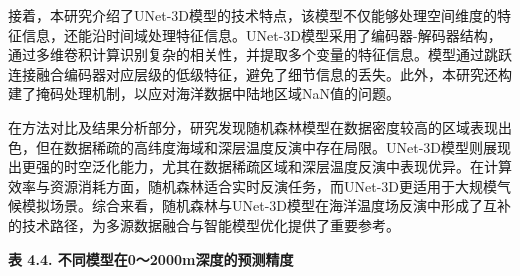 \documentclass[
  12pt,
]{article}
\begin{document}
接着，本研究介绍了UNet-3D模型的技术特点，该模型不仅能够处理空间维度的特征信息，还能沿时间域处理特征信息。UNet-3D模型采用了编码器-解码器结构，通过多维卷积计算识别复杂的相关性，并提取多个变量的特征信息。模型通过跳跃连接融合编码器对应层级的低级特征，避免了细节信息的丢失。此外，本研究还构建了掩码处理机制，以应对海洋数据中陆地区域NaN值的问题。

在方法对比及结果分析部分，研究发现随机森林模型在数据密度较高的区域表现出色，但在数据稀疏的高纬度海域和深层温度反演中存在局限。UNet-3D模型则展现出更强的时空泛化能力，尤其在数据稀疏区域和深层温度反演中表现优异。在计算效率与资源消耗方面，随机森林适合实时反演任务，而UNet-3D更适用于大规模气候模拟场景。综合来看，随机森林与UNet-3D模型在海洋温度场反演中形成了互补的技术路径，为多源数据融合与智能模型优化提供了重要参考。

\textbf{表 4.4. 不同模型在0～2000m深度的预测精度}
\end{document}
